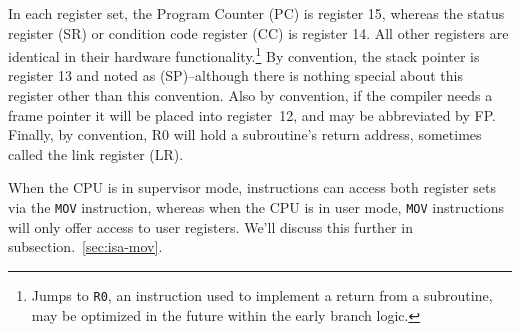 \documentclass{gqtekspec}
\begin{document}
In each register set, the Program Counter (PC) is register 15, whereas
the status register (SR) or condition code register (CC) is register 14.  All
other registers are identical in their hardware functionality.\footnote{Jumps
to {\tt R0}, an instruction used to implement a return from a subroutine, may
be optimized in the future within the early branch logic.} By convention, the
stack pointer is register 13 and noted as (SP)--although there is nothing
special about this register other than this convention.  Also by convention, if
the compiler needs a frame pointer it will be placed into register~12, and may
be abbreviated by FP.  Finally, by convention, R0 will hold a subroutine's
return address, sometimes called the link register (LR).

When the CPU is in supervisor mode, instructions can access both register sets
via the {\tt MOV} instruction, whereas when the CPU is in user mode, {\tt MOV}
instructions will only offer access to user registers.  We'll discuss this
further in subsection.~\ref{sec:isa-mov}.
\end{document}
